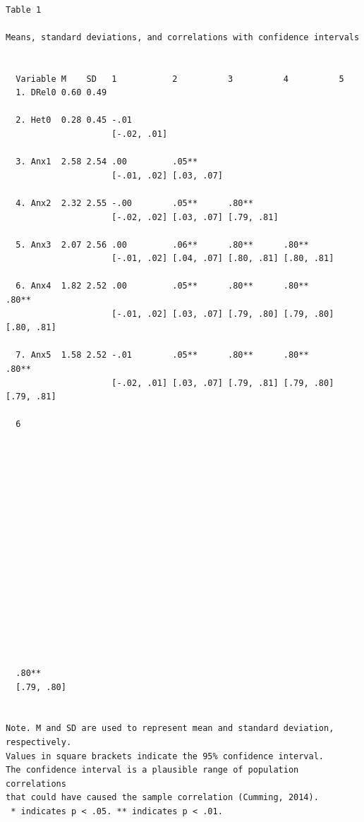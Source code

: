 \documentclass[
  english,
]{book}
\begin{document}
\begin{verbatim}

Table 1 

Means, standard deviations, and correlations with confidence intervals
 

  Variable M    SD   1           2          3          4          5         
  1. DRel0 0.60 0.49                                                        
                                                                            
  2. Het0  0.28 0.45 -.01                                                   
                     [-.02, .01]                                            
                                                                            
  3. Anx1  2.58 2.54 .00         .05**                                      
                     [-.01, .02] [.03, .07]                                 
                                                                            
  4. Anx2  2.32 2.55 -.00        .05**      .80**                           
                     [-.02, .02] [.03, .07] [.79, .81]                      
                                                                            
  5. Anx3  2.07 2.56 .00         .06**      .80**      .80**                
                     [-.01, .02] [.04, .07] [.80, .81] [.80, .81]           
                                                                            
  6. Anx4  1.82 2.52 .00         .05**      .80**      .80**      .80**     
                     [-.01, .02] [.03, .07] [.79, .80] [.79, .80] [.80, .81]
                                                                            
  7. Anx5  1.58 2.52 -.01        .05**      .80**      .80**      .80**     
                     [-.02, .01] [.03, .07] [.79, .81] [.79, .80] [.79, .81]
                                                                            
  6         
            
            
            
            
            
            
            
            
            
            
            
            
            
            
            
            
            
  .80**     
  [.79, .80]
            

Note. M and SD are used to represent mean and standard deviation, respectively.
Values in square brackets indicate the 95% confidence interval.
The confidence interval is a plausible range of population correlations 
that could have caused the sample correlation (Cumming, 2014).
 * indicates p < .05. ** indicates p < .01.
 
\end{verbatim}
\end{document}
